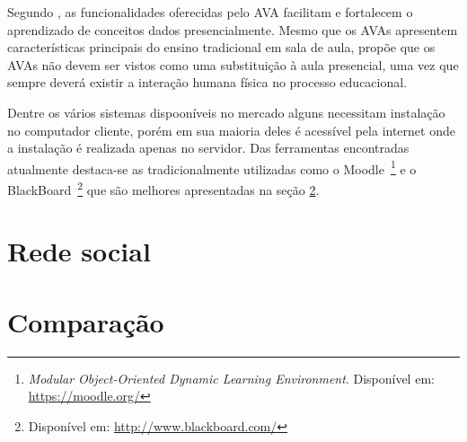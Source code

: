 Segundo , as funcionalidades oferecidas pelo AVA facilitam e fortalecem o aprendizado de conceitos dados presencialmente. Mesmo que os AVAs apresentem características principais do ensino tradicional em sala de aula,  propõe que os AVAs não devem ser vistos como uma substituição à aula presencial, uma vez que sempre deverá existir a interação humana física no processo educacional.

Dentre os vários sistemas dispooníveis no mercado alguns necessitam instalação no computador cliente, porém em sua maioria deles é acessível pela internet onde a instalação é realizada apenas no servidor. Das ferramentas encontradas atualmente destaca-se as tradicionalmente utilizadas como o Moodle~\footnote{\textit{Modular Object-Oriented Dynamic Learning Environment}. Disponível em: \url{https://moodle.org/}} e o BlackBoard~\footnote{Disponível em: \url{http://www.blackboard.com/}} que são melhores apresentadas na seção \ref{comparacao-ava}.
%
%
%
\section{Rede social}
\label{rede-social}

\section{Comparação}
\label{comparacao-ava}


